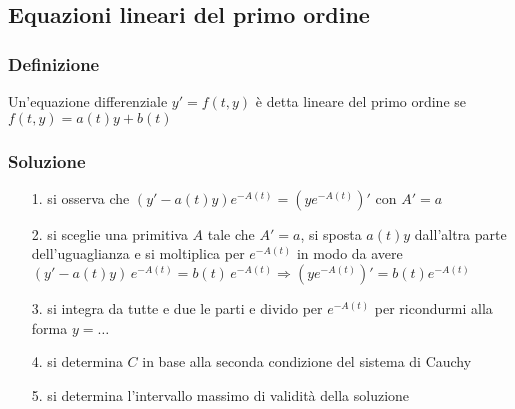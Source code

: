 \documentclass[a4paper]{article}
\begin{document}
\subsection{Equazioni lineari del primo ordine}
\subsubsection*{Definizione}
Un'equazione differenziale \(y' = f(t,y)\) è detta lineare del primo ordine se \(f(t,y) = a(t)y + b(t)\)

\subsubsection*{Soluzione}
\begin{itemize}[topsep=3pt, itemsep=0pt]
	\item[1.] si osserva che \((y'-a(t)y)e^{-A(t)} = (y e^{-A(t)})'\) con \(A' = a\)
	\item[2.] si sceglie una primitiva \(A\) tale che \(A' = a\), si sposta \(a(t)y\) dall'altra parte dell'uguaglianza e si
	moltiplica per \(e^{-A(t)}\) in modo da avere \((y'-a(t)y) \, e^{-A(t)} = b(t) \, e^{-A(t)} \Rightarrow (y e^{-A(t)})' = b(t) e^{-A(t)}\)
	\item[3.] si integra da tutte e due le parti e divido per \(e^{-A(t)}\) per ricondurmi alla forma \(y = \dots\)
	\item[4.] si determina \(C\) in base alla seconda condizione del sistema di Cauchy
	\item[5.] si determina l'intervallo massimo di validità della soluzione
\end{itemize}

\newpage
\end{document}
